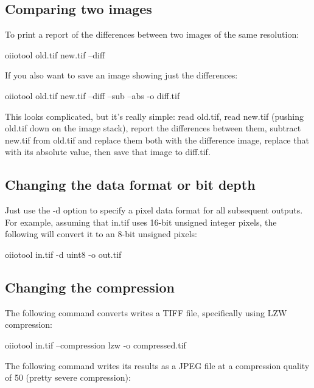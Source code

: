 \subsection*{Comparing two images}

To print a report of the differences between two images of the same
resolution:

\begin{code}
    oiiotool old.tif new.tif --diff
\end{code}

\noindent If you also want to save an image showing just the differences:

\begin{code}
    oiiotool old.tif new.tif --diff --sub --abs -o diff.tif
\end{code}

This looks complicated, but it's really simple: read {\cf old.tif},
read {\cf new.tif} (pushing {\cf old.tif} down on the image stack),
report the differences between them, subtract {\cf new.tif} from 
{\cf old.tif} and replace them both with the difference image,
replace that with its absolute value, then save that image to 
{\cf diff.tif}.


\subsection*{Changing the data format or bit depth}

Just use the {\cf -d} option to specify a pixel data format for all
subsequent outputs.  For example, assuming that {\cf in.tif} uses 16-bit
unsigned integer pixels, the following will convert it to an 8-bit
unsigned pixels:

\begin{code}
    oiiotool in.tif -d uint8 -o out.tif
\end{code}


\subsection*{Changing the compression}

The following command converts writes a TIFF file, specifically using
LZW compression:

\begin{code}
    oiiotool in.tif --compression lzw -o compressed.tif
\end{code}

The following command writes its results as a JPEG file at a 
compression quality of 50 (pretty severe compression):

